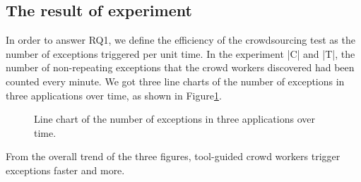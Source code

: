 \subsection{The result of experiment}
In order to answer RQ1, we define the efficiency of the crowdsourcing test as the number of exceptions triggered per unit time. In the experiment |C| and |T|, the number of non-repeating exceptions that the crowd workers discovered had been counted every minute. We got three line charts of the number of exceptions in three applications over time, as shown in Figure\ref{fig:xi}.
\begin{figure}[htbp]
\centering
{}%
%
%
\centering
\caption{Line chart of the number of exceptions in three applications over time.}
\label{fig:xi}
\end{figure}

From the overall trend of the three figures, tool-guided crowd workers trigger exceptions faster and more.

